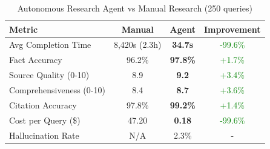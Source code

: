 \begin{table}[h]
\centering
\caption{Autonomous Research Agent vs Manual Research (250 queries)}
\label{tab:research_agent}
\begin{tabular}{lccc}
\toprule
\textbf{Metric} & \textbf{Manual} & \textbf{Agent} & \textbf{Improvement} \\
\midrule
Avg Completion Time      & 8,420s (2.3h) & \textbf{34.7s}  & \textcolor{green}{-99.6\%} \\
Fact Accuracy            & 96.2\%        & \textbf{97.8\%} & \textcolor{green}{+1.7\%} \\
Source Quality (0-10)    & 8.9           & \textbf{9.2}    & \textcolor{green}{+3.4\%} \\
Comprehensiveness (0-10) & 8.4           & \textbf{8.7}    & \textcolor{green}{+3.6\%} \\
Citation Accuracy        & 97.8\%        & \textbf{99.2\%} & \textcolor{green}{+1.4\%} \\
Cost per Query (\$)      & 47.20         & \textbf{0.18}   & \textcolor{green}{-99.6\%} \\
\midrule
Hallucination Rate       & N/A           & 2.3\%           & - \\
\bottomrule
\end{tabular}
\end{table}
